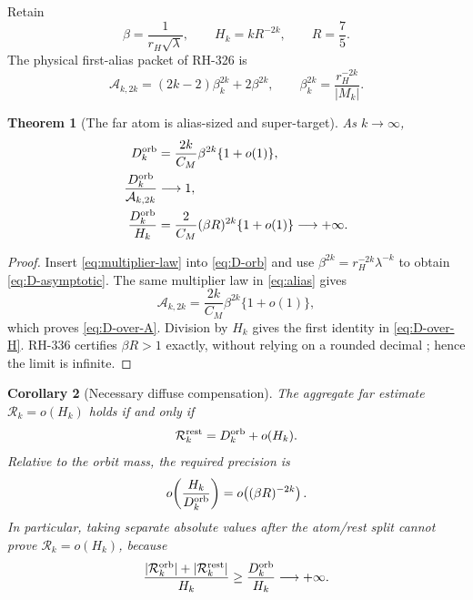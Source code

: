\documentclass[11pt]{article}
\newtheorem{theorem}{Theorem}[section]
\newtheorem{corollary}[theorem]{Corollary}
\theoremstyle{remark}
\newcommand{\cA}{\mathcal A}
\newcommand{\cR}{\mathcal R}
\begin{document}
Retain
\begin{equation}\label{eq:beta-H}
 \beta=\frac1{r_H\sqrt\lambda},
 \qquad H_k=kR^{-2k},
 \qquad R=\frac75.
\end{equation}
The physical first-alias packet of RH-326 \citep{WangFirstAlias2026} is
\begin{equation}\label{eq:alias}
 \cA_{k,2k}=(2k-2)\beta_k^{2k}+2\beta^{2k},
 \qquad
 \beta_k^{2k}=\frac{r_H^{-2k}}{|M_k|}.
\end{equation}

\begin{theorem}[The far atom is alias-sized and super-target]
\label{thm:scales}
As $k\to\infty$,
\begin{align}
 D_k^{\rm orb}
 &=\frac{2k}{C_M}\beta^{2k}\{1+o(1)\},
 \label{eq:D-asymptotic}\\
 \frac{D_k^{\rm orb}}{\cA_{k,2k}}
 &\longrightarrow1,
 \label{eq:D-over-A}\\
 \frac{D_k^{\rm orb}}{H_k}
 &=\frac{2}{C_M}(\beta R)^{2k}\{1+o(1)\}
 \longrightarrow+\infty.
 \label{eq:D-over-H}
\end{align}
\end{theorem}

\begin{proof}
Insert \eqref{eq:multiplier-law} into \eqref{eq:D-orb} and use
$\beta^{2k}=r_H^{-2k}\lambda^{-k}$ to obtain
\eqref{eq:D-asymptotic}.  The same multiplier law in \eqref{eq:alias}
gives
\begin{equation*}
 \cA_{k,2k}=\frac{2k}{C_M}\beta^{2k}\{1+o(1)\},
\end{equation*}
which proves \eqref{eq:D-over-A}.  Division by $H_k$ gives the first
identity in \eqref{eq:D-over-H}.  RH-336 certifies $\beta R>1$ exactly,
without relying on a rounded decimal \citep{WangProjectorMass2026}; hence the
limit is infinite.
\end{proof}

\begin{corollary}[Necessary diffuse compensation]
\label{cor:compensation}
The aggregate far estimate $\cR_k=o(H_k)$ holds if and only if
\begin{equation}\label{eq:compensation}
 \cR_k^{\rm rest}=D_k^{\rm orb}+o(H_k).
\end{equation}
Relative to the orbit mass, the required precision is
\begin{equation}\label{eq:relative-precision}
 o\!\left(\frac{H_k}{D_k^{\rm orb}}\right)
 =o\!\left((\beta R)^{-2k}\right).
\end{equation}
In particular, taking separate absolute values after the atom/rest split
cannot prove $\cR_k=o(H_k)$, because
\begin{equation}\label{eq:absolute-obstruction}
 \frac{|\cR_k^{\rm orb}|+|\cR_k^{\rm rest}|}{H_k}
 \ge\frac{D_k^{\rm orb}}{H_k}\longrightarrow+\infty.
\end{equation}
\end{corollary}
\end{document}

